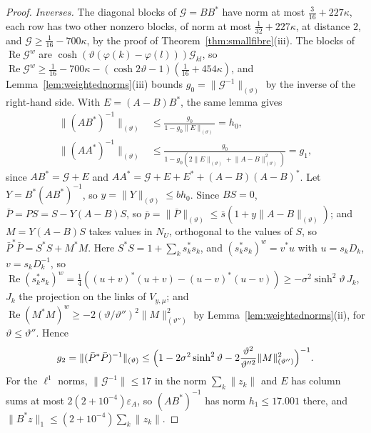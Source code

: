 \documentclass[11pt]{amsart}
\theoremstyle{definition}
\theoremstyle{remark}
\numberwithin{equation}{section}
\begin{document}
\begin{proof}
\emph{Inverses.} The diagonal blocks of $\mathcal G=BB^*$ have norm at most
$\frac3{16}+227\kappa$, each row has two other nonzero blocks, of norm at
most $\frac1{32}+227\kappa$, at distance $2$, and $\mathcal G\ge\frac1{16}-
700\kappa$, by the proof of Theorem~\ref{thm:smallfibre}(iii). The blocks of
$\operatorname{Re}\mathcal G^w$ are $\cosh(\vartheta(\varphi(k)-\varphi(l)))
\mathcal G_{kl}$, so $\operatorname{Re}\mathcal G^w\ge\frac1{16}-700\kappa-(
\cosh2\vartheta-1)(\frac1{16}+454\kappa)$, and
Lemma~\ref{lem:weightednorms}(iii) bounds $g_0=\lVert\mathcal G^{-1}\rVert
_{(\vartheta)}$ by the inverse of the right-hand side. With $E=(A-B)B^*$, the
same lemma gives
\[
\begin{split}
\lVert(AB^*)^{-1}\rVert_{(\vartheta)}&\le\frac{g_0}{1-g_0\lVert E\rVert
_{(\vartheta)}}=h_0,\\
\lVert(AA^*)^{-1}\rVert_{(\vartheta)}&\le\frac{g_0}{1-g_0(2\lVert E\rVert
_{(\vartheta)}+\lVert A-B\rVert_{(\vartheta)}^2)}=g_1,
\end{split}
\]
since $AB^*=\mathcal G+E$ and $AA^*=\mathcal G+E+E^*+(A-B)(A-B)^*$. Let
$Y=B^*(AB^*)^{-1}$, so $y=\lVert Y\rVert_{(\vartheta)}\le bh_0$. Since $BS=0$,
$\bar P=PS=S-Y(A-B)S$, so $\bar p=\lVert\bar P\rVert_{(\vartheta)}\le\bar s(1+
y\lVert A-B\rVert_{(\vartheta)})$; and $M=Y(A-B)S$ takes values in $N_U$,
orthogonal to the values of $S$, so $\bar P^*\bar P=S^*S+M^*M$. Here $S^*S=1+
\sum_ks_k^*s_k$, and $(s_k^*s_k)^w=v^*u$ with $u=s_kD_k$, $v=s_kD_k^{-1}$, so
$\operatorname{Re}(s_k^*s_k)^w=\frac14((u+v)^*(u+v)-(u-v)^*(u-v))\ge-\sigma^2
\sinh^2\vartheta\,J_k$, $J_k$ the projection on the links of $V_{y,\mu}$; and
$\operatorname{Re}(M^*M)^w\ge-2(\vartheta/\vartheta'')^2\lVert M\rVert_{(
\vartheta'')}^2$ by Lemma~\ref{lem:weightednorms}(ii), for $\vartheta\le
\vartheta''$. Hence
\[
g_2=\lVert(\bar P^*\bar P)^{-1}\rVert_{(\vartheta)}\le\Bigl(1-2\sigma^2\sinh
^2\vartheta-2\frac{\vartheta^2}{\vartheta''^2}\lVert M\rVert_{(\vartheta'')}
^2\Bigr)^{-1}.
\]
For the $\ell^1$ norms, $\lVert\mathcal G^{-1}\rVert\le17$ in the norm
$\sum_k\lVert z_k\rVert$ and $E$ has column sums at most $2(2+10^{-4})
\varepsilon_A$, so $(AB^*)^{-1}$ has norm $h_1\le17.001$ there, and $\lVert
B^*z\rVert_1\le(2+10^{-4})\sum_k\lVert z_k\rVert$.


\end{proof}
\end{document}
